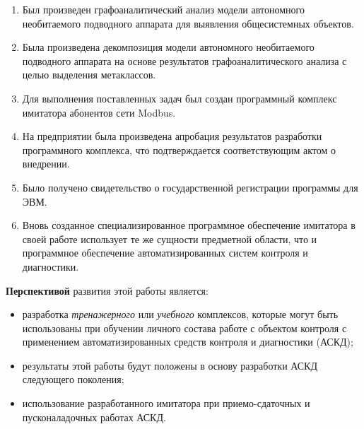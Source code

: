 \begin{enumerate}
  \item Был произведен графоаналитический анализ модели автономного необитаемого подводного аппарата для выявления
      общесистемных объектов.
  \item Была произведена декомпозиция модели автономного необитаемого подводного аппарата на основе результатов
      графоаналитического анализа с целью выделения метаклассов.
  \item Для выполнения поставленных задач был создан программный комплекс имитатора абонентов сети Modbus.
  \item На предприятии \leadingOrganizationTitle была произведена апробация результатов разработки программного комплекса,
      что подтверждается соответствующим актом о внедрении.
  \item Было получено свидетельство о государственной регистрации программы для ЭВМ.
  \item Вновь созданное специализированное программное обеспечение имитатора 
        в своей работе использует те же сущности предметной области, что и программное обеспечение 
        автоматизированных систем контроля и диагностики.
\end{enumerate}

\textbf{Перспективой} развития этой работы является:
\begin{itemize}
    \item разработка \textit{тренажерного} или \textit{учебного} комплексов, которые могут быть использованы при обучении
            личного состава работе с объектом контроля с применением автоматизированных средств контроля и диагностики (АСКД);
    \item результаты этой работы будут положены в основу разработки АСКД следующего поколения;
    \item использование разработанного имитатора при приемо-сдаточных и пусконаладочных работах АСКД.
\end{itemize}

